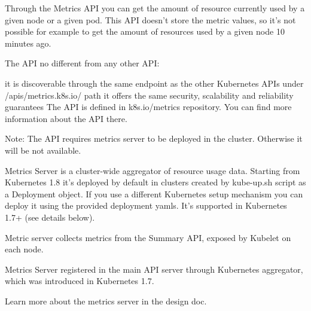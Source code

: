 Through the Metrics API you can get the amount of resource currently used by a given node or a given pod. This API doesn’t store the metric values, so it’s not possible for example to get the amount of resources used by a given node 10 minutes ago.

The API no different from any other API:

it is discoverable through the same endpoint as the other Kubernetes APIs under /apis/metrics.k8s.io/ path
it offers the same security, scalability and reliability guarantees
The API is defined in k8s.io/metrics repository. You can find more information about the API there.

Note: The API requires metrics server to be deployed in the cluster. Otherwise it will be not available.

Metrics Server is a cluster-wide aggregator of resource usage data. Starting from Kubernetes 1.8 it’s deployed by default in clusters created by kube-up.sh script as a Deployment object. If you use a different Kubernetes setup mechanism you can deploy it using the provided deployment yamls. It’s supported in Kubernetes 1.7+ (see details below).

Metric server collects metrics from the Summary API, exposed by Kubelet on each node.

Metrics Server registered in the main API server through Kubernetes aggregator, which was introduced in Kubernetes 1.7.

Learn more about the metrics server in the design doc.